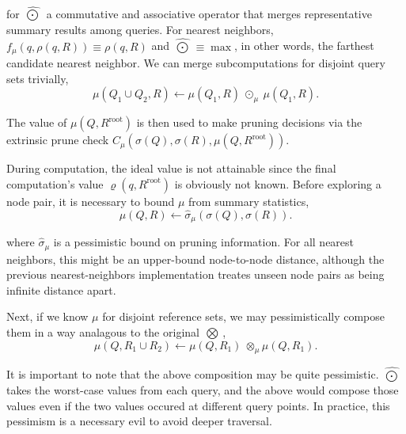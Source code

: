 \documentclass[twoside,leqno,twocolumn]{article}
\newcommand{\authornote}[1]{\footnote{Note to self: #1}}
\newcommand{\union}{\cup}
\newcommand{\summary}{\hat{\sigma}}
\newcommand{\kdroot}[1]{#1^{\text{root}}}
\newcommand{\nameOp}[2]{\mathop{#1\nolimits\!\!_{#2}}}
\newcommand{\nameop}[2]{{\scriptstyle\:}#1_{\!#2}}
\newcommand{\myOp}[1]{\nameOp{\bigotimes}{#1}}
\newcommand{\myop}[1]{\nameop{\otimes}{#1}}
\newcommand{\letterqr}{\rho}
\newcommand{\outqr}{\varrho}
\newcommand{\inqr}{\rho}
\newcommand{\Opqr}{\myOp{\letterqr}}
\newcommand{\lettermu}{\mu}
\newcommand{\inmu}{\mu}
\newcommand{\Outopmu}{\widehat{\nameOp{\bigodot}{\lettermu}}}%
\newcommand{\outopmu}{\:\widehat{\odot}_{\!\mu}\:}
\newcommand{\opmu}{\myop{\lettermu}}
\newcommand{\fmu}{f_{\!\lettermu}}
\newcommand{\deltamu}{\summary_{\!\lettermu}}
\newcommand{\canprunemu}{C_{\!\lettermu}}
\newcommand{\outstat}{\sigma}
\begin{document}
\noindent for $\Outopmu$ a commutative and associative operator that merges representative summary results among queries.
For nearest neighbors, $\fmu(q, \inqr(q, R)) \equiv \inqr(q, R)$ and $\Outopmu \equiv \max$, in other words, the farthest candidate nearest neighbor.
We can merge subcomputations for disjoint query sets trivially,
\begin{equation}
\inmu(Q_1 \union Q_2, R) \gets \inmu(Q_1, R) \outopmu \inmu(Q_1, R).
\label{eqn:muchild}
\end{equation}

\noindent
The value of $\inmu(Q, \kdroot{R})$ is then used to make pruning decisions via the extrinsic prune check $\canprunemu(\outstat(Q), \outstat(R), \inmu(Q, \kdroot{R}))$.

During computation, the ideal value is not attainable since the final computation's value $\outqr(q, \kdroot{R})$ is obviously not known.
Before exploring a node pair, it is necessary to bound $\inmu$ from summary statistics,
\begin{equation}
\inmu(Q, R) \gets \deltamu(\outstat(Q), \outstat(R)).
\label{eqn:mudelta}
\end{equation}

\noindent
where $\deltamu$ is a pessimistic bound on pruning information.
For all nearest neighbors, this might be an upper-bound node-to-node distance, although the previous nearest-neighbors implementation treates unseen node pairs as being infinite distance apart.

Next, if we know $\inmu$ for disjoint reference sets, we may pessimistically compose them in a way analagous to the original $\Opqr$,
\begin{equation}
\inmu(Q, R_1 \union R_2) \gets \inmu(Q, R_1) \opmu \inmu(Q, R_1).
\label{eqn:mucompose}
\end{equation}

\noindent
It is important to note that the above composition may be quite pessimistic.
$\Outopmu$ takes the worst-case values from each query, and the above would compose those values even if the two values occured at different query points.
In practice, this pessimism is a necessary evil to avoid deeper traversal.
\end{document}
